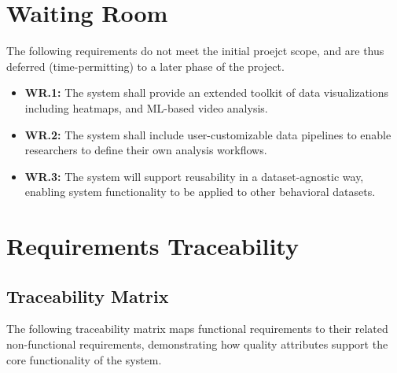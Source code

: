 \documentclass[12pt]{article}
\begin{document}
\section{Waiting Room}

\par{The following requirements do not meet the initial proejct scope, and are thus deferred (time-permitting) to a later phase of the project. }

\begin{itemize}
    \item \textbf{WR.1:} The system shall provide an extended toolkit of data visualizations including heatmaps, and ML-based video analysis.
    \item \textbf{WR.2:} The system shall include user-customizable data pipelines to enable researchers to define their own analysis workflows.
    \item \textbf{WR.3:} The system will support reusability in a dataset-agnostic way, enabling system functionality to be applied to other behavioral datasets.
\end{itemize}

\section{Requirements Traceability}

\subsection{Traceability Matrix}

The following traceability matrix maps functional requirements to their related non-functional requirements, demonstrating how quality attributes support the core functionality of the system.
\end{document}

